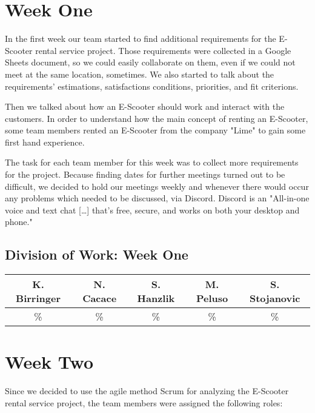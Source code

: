 \documentclass[a4paper, 12pt]{article}
\begin{document}
\section{Week One}
In the first week our team started to find additional requirements for the E-Scooter rental service project. Those requirements were collected in a Google Sheets document, so we could easily collaborate on them, even if we could not meet at the same location, sometimes. We also started to talk about the requirements' estimations, satisfactions conditions, priorities, and fit criterions.

Then we talked about how an E-Scooter should work and interact with the customers.
In order to understand how the main concept of renting an E-Scooter, some team members rented an E-Scooter from the company "Lime" to gain some first hand experience.

The task for each team member for this week was to collect more requirements for the project.
Because finding dates for further meetings turned out to be difficult, we decided to hold our meetings weekly and whenever there would occur any problems which needed to be discussed, via Discord. Discord is an "All-in-one voice and text chat [\ldots] that's free, secure, and works on both your desktop and phone."\cite{discord}

\subsection{Division of Work: Week One}
\begin{table}[h]
\centering
\setlength{\tabcolsep}{10pt}
\begin{tabular}{|c|c|c|c|c|}
\hline
K. Birringer & N. Cacace & S. Hanzlik & M. Peluso & S. Stojanovic\\
\hline
\% & \% & \% & \% & \% \\ 
\hline
\end{tabular}
\end{table}

\section{Week Two}
Since we decided to use the agile method Scrum for analyzing the E-Scooter rental service project, the team members were assigned the following roles:
\end{document}

